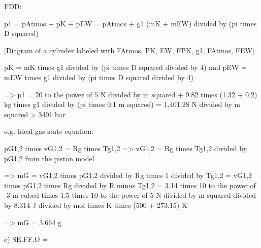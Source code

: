 FDD:

p1 = pAtmos + pK + pEW = pAtmos + g1 (mK + mEW) divided by (pi times D squared)

[Diagram of a cylinder labeled with FAtmos, PK, EW, FPK, g1, FAtmos, FEW]

pK = mK times g1 divided by (pi times D squared divided by 4) and pEW = mEW times g1 divided by (pi times D squared divided by 4)

=> p1 = 20 to the power of 5 N divided by m squared + 9.82 times (1.32 + 0.2) kg times g1 divided by (pi times 0.1 m squared) = 1,401.28 N divided by m squared > 3401 bar

o.g. Ideal gas state equation:

pG1,2 times vG1,2 = Rg times Tg1,2 => vG1,2 = Rg times Tg1,2 divided by pG1,2 from the piston model

=> mG = vG1,2 times pG1,2 divided by Rg times 1 divided by Tg1,2 = vG1,2 times pG1,2 times Rg divided by R minus Tg1,2 = 3.14 times 10 to the power of -3 m cubed times 1.5 times 10 to the power of 5 N divided by m squared divided by 8.314 J divided by mol times K times (500 + 273.15) K

=> mG = 3.664 g

c)
SE.FF.O =